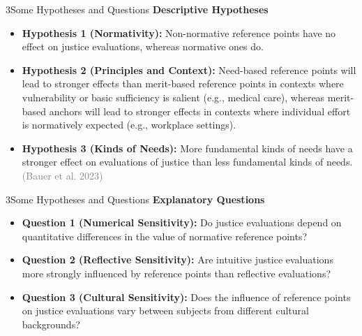 \documentclass[xcolor=table,9pt,aspectratio=169]{beamer}
\begin{document}
\begin{frame}{\vspace*{10mm}3\hspace*{1em}Some Hypotheses and Questions}
   \textbf{Descriptive Hypotheses}
   
   \medskip
   \begin{itemize}
      \item \textbf{Hypothesis 1 (Normativity):} Non-normative reference points have no effect on justice evaluations, whereas normative ones do.
      \item \textbf{Hypothesis 2 (Principles and Context):} Need-based reference points will lead to stronger effects than merit-based reference points in contexts where vulnerability or basic sufficiency is salient (e.g., medical care), whereas merit-based anchors will lead to stronger effects in contexts where individual effort is normatively expected (e.g., workplace settings).
      \item \textbf{Hypothesis 3 (Kinds of Needs):} More fundamental kinds of needs have a stronger effect on evaluations of justice than less fundamental kinds of needs. \textcolor{gray}{(Bauer et al. 2023)}
   \end{itemize}
\end{frame}


\begin{frame}{\vspace*{10mm}3\hspace*{1em}Some Hypotheses and Questions}
   \textbf{Explanatory Questions}
   
   \medskip
   \begin{itemize}
      \item \textbf{Question 1 (Numerical Sensitivity):} Do justice evaluations depend on quantitative differences in the value of normative reference points?
      \item \textbf{Question 2 (Reflective Sensitivity):} Are intuitive justice evaluations more strongly influenced by reference points than reflective evaluations?
      \item \textbf{Question 3 (Cultural Sensitivity):} Does the influence of reference points on justice evaluations vary between subjects from different cultural backgrounds?
   \end{itemize}
\end{frame}
\end{document}
